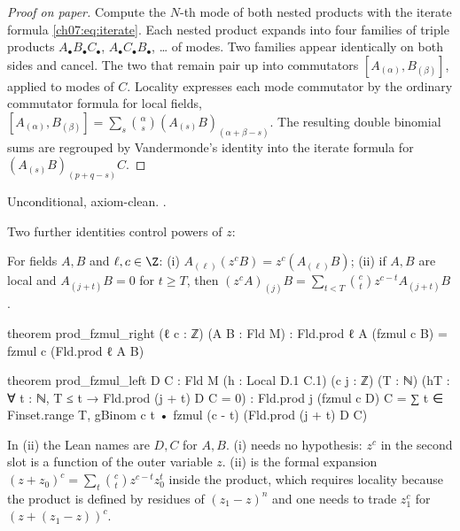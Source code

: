 \begin{proof}[Proof on paper]
Compute the $N$-th mode of both nested products with the iterate formula
\eqref{ch07:eq:iterate}. Each nested product expands into four families of triple products
$A_\bullet B_\bullet C_\bullet$, $A_\bullet C_\bullet B_\bullet$, \dots{} of modes. Two families
appear identically on both sides and cancel. The two that remain pair up into commutators
$[A_{(\alpha)},B_{(\beta)}]$, applied to modes of $C$. Locality expresses each mode commutator by
the ordinary commutator formula for local fields,
$[A_{(\alpha)},B_{(\beta)}] = \sum_s\binom\alpha s(A_{(s)}B)_{(\alpha+\beta-s)}$. The resulting
double binomial sums are regrouped by Vandermonde's identity into the iterate formula for
$(A_{(s)}B)_{(p+q-s)}C$.
\end{proof}

\begin{status}
Unconditional, axiom-clean. .
\end{status}

Two further identities control powers of $z$:

\begin{proposition}\label{ch07:prop:zpow}
For fields $A,B$ and $\ell,c\in\Z$: (i) $A_{(\ell)}(z^cB) = z^c(A_{(\ell)}B)$; (ii) if $A,B$ are
local and $A_{(j+t)}B = 0$ for $t\ge T$, then $(z^cA)_{(j)}B = \sum_{t<T}\binom ct z^{c-t}
A_{(j+t)}B$.
\end{proposition}

\begin{leancode}
theorem prod_fzmul_right (ℓ c : ℤ) (A B : Fld M) :
    Fld.prod ℓ A (fzmul c B) = fzmul c (Fld.prod ℓ A B)

theorem prod_fzmul_left {D C : Fld M} (h : Local D.1 C.1) (c j : ℤ) (T : ℕ)
    (hT : ∀ t : ℕ, T ≤ t → Fld.prod (j + t) D C = 0) :
    Fld.prod j (fzmul c D) C
      = ∑ t ∈ Finset.range T, gBinom c t • fzmul (c - t) (Fld.prod (j + t) D C)
\end{leancode}

\begin{dictionary}
In (ii) the Lean names are $D,C$ for $A,B$. (i) needs no hypothesis: $z^c$ in the second slot
is a function of the outer variable $z$. (ii) is the formal expansion
$(z+z_0)^c = \sum_t\binom ct z^{c-t}z_0^t$ inside the product, which requires locality because
the product is defined by residues of $(z_1-z)^n$ and one needs to trade $z_1^c$ for
$(z+(z_1-z))^c$.
\end{dictionary}

